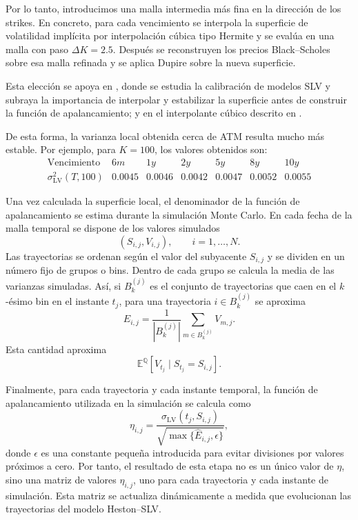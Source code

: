 Por lo tanto, introducimos una malla intermedia más fina en la dirección de los strikes. En concreto, para cada vencimiento se interpola la superficie de volatilidad implícita por interpolación cúbica tipo Hermite y se evalúa en una malla con paso \(\Delta K=2.5\). Después se reconstruyen los precios Black--Scholes sobre esa malla refinada y se aplica Dupire sobre la nueva superficie. 

Esta elección se apoya en \cite{SaporitoYangZubelli2017,Corlay2013}, donde se estudia la calibración de modelos SLV y subraya la importancia de interpolar y estabilizar la superficie antes de construir la función de apalancamiento; y en el interpolante cúbico descrito en \cite{FritschButland1984}.\medskip

De esta forma, la varianza local obtenida cerca de ATM resulta mucho más estable. Por ejemplo, para \(K=100\), los valores obtenidos son:
\[
\begin{array}{c|cccccc}
\text{Vencimiento} & 6m & 1y & 2y & 5y & 8y & 10y \\
\hline
\sigma_{\mathrm{LV}}^2(T,100)
& 0.0045 & 0.0046 & 0.0042 & 0.0047 & 0.0052 & 0.0055
\end{array}
\]

Una vez calculada la superficie local, el denominador de la función de apalancamiento se estima durante la simulación Monte Carlo. En cada fecha de la malla temporal se dispone de los valores simulados
\[
(S_{i,j},V_{i,j}), \qquad i=1,\ldots,N.
\]
Las trayectorias se ordenan según el valor del subyacente \(S_{i,j}\) y se dividen en un número fijo de grupos o bins. Dentro de cada grupo se calcula la media de las varianzas simuladas. Así, si \(B_k^{(j)}\) es el conjunto de trayectorias que caen en el \(k\)-ésimo bin en el instante \(t_j\), para una trayectoria \(i\in B_k^{(j)}\) se aproxima
\[
\widehat E_{i,j}
=
\frac{1}{|B_k^{(j)}|}
\sum_{m\in B_k^{(j)}} V_{m,j}.
\]
Esta cantidad aproxima
\[
\mathbb{E}^{\mathbb{Q}}[V_{t_j}\mid S_{t_j}=S_{i,j}].
\]

Finalmente, para cada trayectoria y cada instante temporal, la función de apalancamiento utilizada en la simulación se calcula como
\[
\eta_{i,j}
=
\frac{\sigma_{\mathrm{LV}}(t_j,S_{i,j})}
{\sqrt{\max\{\widehat E_{i,j},\epsilon\}}},
\]
donde \(\epsilon\) es una constante pequeña introducida para evitar divisiones por valores próximos a cero. Por tanto, el resultado de esta etapa no es un único valor de \(\eta\), sino una matriz de valores \(\eta_{i,j}\), uno para cada trayectoria y cada instante de simulación. Esta matriz se actualiza dinámicamente a medida que evolucionan las trayectorias del modelo Heston--SLV.


